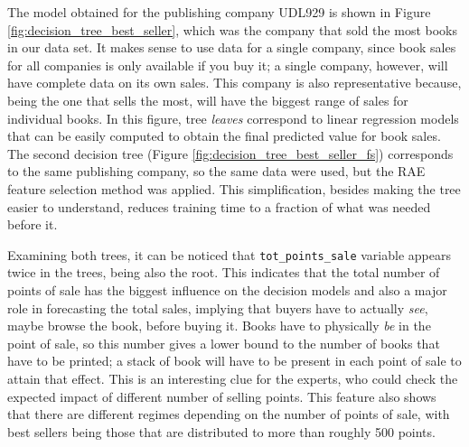 \documentclass[a4paper,10pt,twocolumn,preprint,3p]{elsarticle}
\begin{document}
The model obtained for the publishing company UDL929 is shown in
Figure \ref{fig:decision_tree_best_seller}, which was the company that
sold the most books in our data set. It makes sense to use data for a
single company, since book sales for all companies is only available
if you buy it; a single company, however, will have complete data on
its own sales. This company is also representative because, being the
one that sells the most, will have the biggest range of sales for
individual books. In this figure, tree {\em leaves} correspond to
linear regression models that can be easily computed to obtain the
final predicted value for book sales.
The second decision tree (Figure
\ref{fig:decision_tree_best_seller_fs}) corresponds to the same
publishing company, so the same data were used, but the RAE feature
selection method was applied. This simplification, besides making the
tree easier to understand, reduces training time to a fraction of what
was needed before it. 

Examining both trees, it can be noticed that
\texttt{tot\_points\_sale} variable appears twice in the trees, being
also the root. This indicates that the total number of points of sale
has the biggest influence on the decision models and also a major role in
forecasting the total sales, implying that buyers have to actually
{\em see}, maybe browse the book, before buying it. Books have to
physically {\em be} in the point of sale, so this number gives a lower
bound to the number of books that have to be printed; a stack of book
will have to be present in each point of sale to attain that effect. 
 This is an interesting clue for the
experts, who could check the expected impact of different number of
selling points. This feature also shows that there are different
regimes depending on the number of points of sale, with best sellers
being those that are distributed to more than roughly 500 points. 
\end{document}
